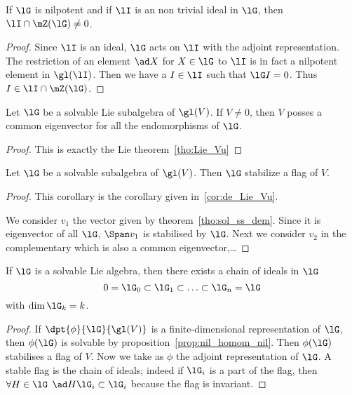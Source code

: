 \begin{lemma}
If $\lG$ is nilpotent and if $\lI$ is an non trivial ideal in $\lG$, then $\lI\cap\mZ(\lG)\neq 0$.
\end{lemma}

\begin{proof}
Since $\lI$ is an ideal, $\lG$ acts on $\lI$ with the adjoint representation. The restriction of an element $\ad X$ for $X\in\lG$ to $\lI$ is in fact a nilpotent element in $\gl(\lI)$. Then we have a $I\in\lI$ such that $\lG I=0$. Thus $I\in\lI\cap\mZ(\lG)$.
\end{proof}

\begin{theorem}
Let $\lG$ be a solvable Lie subalgebra of $\gl(V)$. If $V\neq 0$, then $V$ posses a common eigenvector for all the endomorphisms of $\lG$.
\label{tho:sol_ss_dem}
\end{theorem}

\begin{proof}
This is exactly the Lie theorem~\ref{tho:Lie_Vu}
\end{proof}

\begin{corollary}
Let $\lG$ be a solvable subalgebra of $\gl(V)$. Then $\lG$ stabilize a flag of $V$.
\label{tho:Lie_Vd}
\end{corollary}

\begin{proof}

This corollary is the corollary given in~\ref{cor:de_Lie_Vu}.

We consider $v_1$ the vector given by theorem~\ref{tho:sol_ss_dem}. Since it is eigenvector of all $\lG$, $\Span v_1$ is stabilised by $\lG$. Next we consider $v_2$ in the complementary which is also a common eigenvector,\ldots
\end{proof}

\begin{corollary}
If $\lG$ is a solvable Lie algebra, then there exists a chain of ideals in $\lG$
\[
  0=\lG_0\subset\lG_1\subset\ldots\subset\lG_n=\lG
\]
with $\dim\lG_k=k$.
\end{corollary}

\begin{proof}
If $\dpt{\phi}{\lG}{\gl(V)}$ is a finite-dimensional representation of $\lG$, then $\phi(\lG)$ is solvable by proposition~\ref{prop:nil_homom_nil}. Then $\phi(\lG)$ stabilises a flag of $V$. Now we take as $\phi$ the adjoint representation of $\lG$. A stable flag is the chain of ideals; indeed if $\lG_i$ is a part of the flag, then $\forall H\in\lG$ $\ad H\lG_i\subset\lG_i$ because the flag is invariant.
\end{proof}


